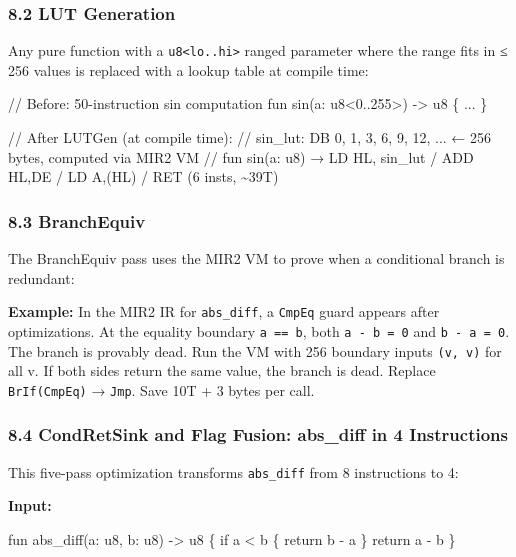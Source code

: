 \documentclass[
  11pt,
]{article}
\newenvironment{Shaded}{}{}
\newcommand{\NormalTok}[1]{#1}
\begin{document}
\subsubsection{8.2 LUT Generation}\label{lut-generation}

Any pure function with a \texttt{u8\textless{}lo..hi\textgreater{}}
ranged parameter where the range fits in ≤ 256 values is replaced with a
lookup table at compile time:

\begin{Shaded}
\begin{Highlighting}[]
\NormalTok{// Before: 50{-}instruction sin computation}
\NormalTok{fun sin(a: u8\textless{}0..255\textgreater{}) {-}\textgreater{} u8 \{ ... \}}

\NormalTok{// After LUTGen (at compile time):}
\NormalTok{// sin\_lut: DB 0, 1, 3, 6, 9, 12, ...  ← 256 bytes, computed via MIR2 VM}
\NormalTok{// fun sin(a: u8) → LD HL, sin\_lut / ADD HL,DE / LD A,(HL) / RET  (6 insts, \textasciitilde{}39T)}
\end{Highlighting}
\end{Shaded}

\subsubsection{8.3 BranchEquiv}\label{branchequiv}

The BranchEquiv pass uses the MIR2 VM to prove when a conditional branch
is redundant:

\textbf{Example:} In the MIR2 IR for \texttt{abs\_diff}, a
\texttt{CmpEq} guard appears after optimizations. At the equality
boundary \texttt{a\ ==\ b}, both \texttt{a\ -\ b\ =\ 0} and
\texttt{b\ -\ a\ =\ 0}. The branch is provably dead. Run the VM with 256
boundary inputs \texttt{(v,\ v)} for all v. If both sides return the
same value, the branch is dead. Replace \texttt{BrIf(CmpEq)} →
\texttt{Jmp}. Save 10T + 3 bytes per call.

\subsubsection{8.4 CondRetSink and Flag Fusion: abs\_diff in 4
Instructions}\label{condretsink-and-flag-fusion-abs_diff-in-4-instructions}

This five-pass optimization transforms \texttt{abs\_diff} from 8
instructions to 4:

\textbf{Input:}

\begin{Shaded}
\begin{Highlighting}[]
\NormalTok{fun abs\_diff(a: u8, b: u8) {-}\textgreater{} u8 \{}
\NormalTok{    if a \textless{} b \{ return b {-} a \}}
\NormalTok{    return a {-} b}
\NormalTok{\}}
\end{Highlighting}
\end{Shaded}
\end{document}
